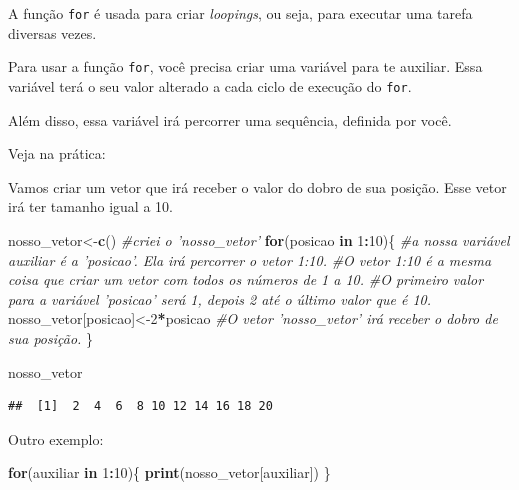 \documentclass[
]{book}
\newenvironment{Shaded}{\begin{snugshade}}{\end{snugshade}}
\newcommand{\CommentTok}[1]{\textcolor[rgb]{0.56,0.35,0.01}{\textit{#1}}}
\newcommand{\ControlFlowTok}[1]{\textcolor[rgb]{0.13,0.29,0.53}{\textbf{#1}}}
\newcommand{\DecValTok}[1]{\textcolor[rgb]{0.00,0.00,0.81}{#1}}
\newcommand{\KeywordTok}[1]{\textcolor[rgb]{0.13,0.29,0.53}{\textbf{#1}}}
\newcommand{\NormalTok}[1]{#1}
\newcommand{\OperatorTok}[1]{\textcolor[rgb]{0.81,0.36,0.00}{\textbf{#1}}}
\begin{document}
A função \texttt{for} é usada para criar \emph{loopings}, ou seja, para
executar uma tarefa diversas vezes.

Para usar a função \texttt{for}, você precisa criar uma variável para te
auxiliar. Essa variável terá o seu valor alterado a cada ciclo de
execução do \texttt{for}.

Além disso, essa variável irá percorrer uma sequência, definida por
você.

Veja na prática:

Vamos criar um vetor que irá receber o valor do dobro de sua posição.
Esse vetor irá ter tamanho igual a 10.

\begin{Shaded}
\begin{Highlighting}[]
\NormalTok{nosso_vetor<-}\KeywordTok{c}\NormalTok{()     }\CommentTok{#criei o 'nosso_vetor'}
\ControlFlowTok{for}\NormalTok{(posicao }\ControlFlowTok{in} \DecValTok{1}\OperatorTok{:}\DecValTok{10}\NormalTok{)\{ }\CommentTok{#a nossa variável auxiliar é a 'posicao'. Ela irá percorrer o vetor 1:10.}
                      \CommentTok{#O vetor 1:10 é a mesma coisa que criar um vetor com todos os números de 1 a 10.}
                      \CommentTok{#O primeiro valor para a variável 'posicao' será 1, depois 2 até o último valor que é 10.}
\NormalTok{  nosso_vetor[posicao]<-}\DecValTok{2}\OperatorTok{*}\NormalTok{posicao  }\CommentTok{#O vetor 'nosso_vetor' irá receber o dobro de sua posição.}
\NormalTok{\}}
\end{Highlighting}
\end{Shaded}

\begin{Shaded}
\begin{Highlighting}[]
\NormalTok{nosso_vetor}
\end{Highlighting}
\end{Shaded}

\begin{verbatim}
##  [1]  2  4  6  8 10 12 14 16 18 20
\end{verbatim}

Outro exemplo:

\begin{Shaded}
\begin{Highlighting}[]
\ControlFlowTok{for}\NormalTok{(auxiliar }\ControlFlowTok{in} \DecValTok{1}\OperatorTok{:}\DecValTok{10}\NormalTok{)\{}
  \KeywordTok{print}\NormalTok{(nosso_vetor[auxiliar])}
\NormalTok{\}}
\end{Highlighting}
\end{Shaded}
\end{document}
